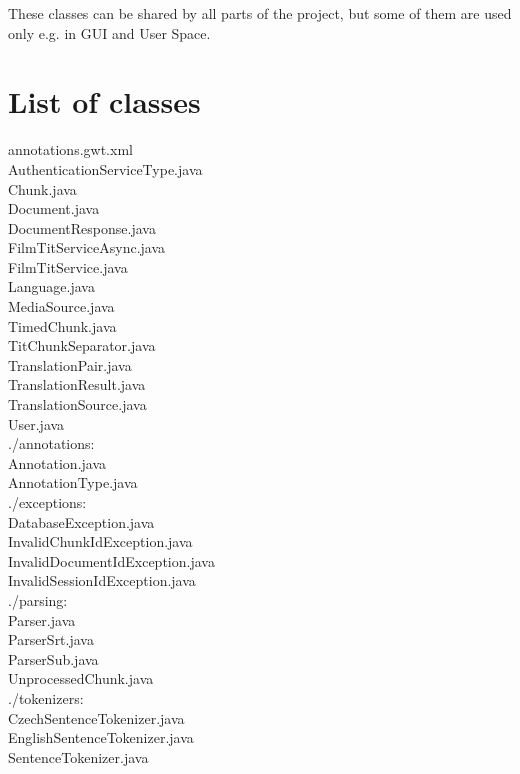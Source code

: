 

These classes can be shared by all parts of the project, but some of them are used only e.g. in GUI and User Space.
\section{List of classes}
annotations.gwt.xml \\
AuthenticationServiceType.java \\
Chunk.java \\
Document.java \\
DocumentResponse.java \\
FilmTitServiceAsync.java \\
FilmTitService.java \\
Language.java \\
MediaSource.java \\
TimedChunk.java \\
TitChunkSeparator.java \\
TranslationPair.java \\
TranslationResult.java \\
TranslationSource.java \\
User.java \\

./annotations: \\
Annotation.java \\
AnnotationType.java \\

./exceptions: \\
DatabaseException.java \\
InvalidChunkIdException.java \\
InvalidDocumentIdException.java \\
InvalidSessionIdException.java \\

./parsing: \\
Parser.java \\
ParserSrt.java \\
ParserSub.java \\
UnprocessedChunk.java \\

./tokenizers: \\
CzechSentenceTokenizer.java \\
EnglishSentenceTokenizer.java \\
SentenceTokenizer.java \\

